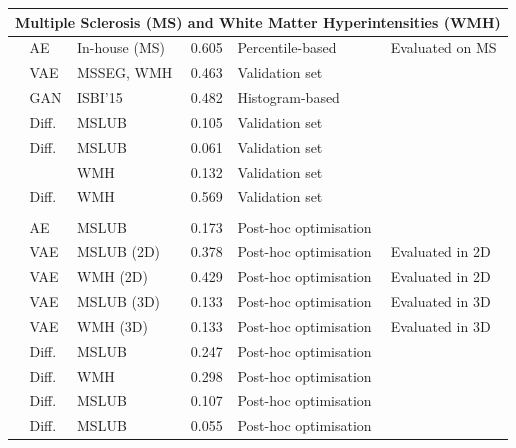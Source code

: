 \begin{longtable}{lp{1.2cm}lclp{5.5cm}}
\multicolumn{6}{l}{\textbf{Multiple Sclerosis (MS) and White Matter Hyperintensities (WMH)}} \\
\midrule
\citet{Baur2018} & AE & In-house (MS) & 0.605 & Percentile-based & Evaluated on MS\\
\citet{Lambert2021} & VAE & MSSEG, WMH & 0.463 & Validation set & \\
\citet{Dey2021} & GAN & ISBI'15 & 0.482 & Histogram-based & \\
\citet{Behrendt2023} & Diff. & MSLUB & 0.105 & Validation set & \\
\citet{Behrendt2024} & Diff. & MSLUB & 0.061 & Validation set & \\
 & & WMH & 0.132 & Validation set & \\
\citet{Fontanella2024} & Diff. & WMH & 0.569 & Validation set & \\
\addlinespace
\multicolumn{6}{l}{\textit{\small --- Studies using Retrospectively Optimized (Oracle) Thresholds ---}} \\
\addlinespace
\citet{Ghorbel2023} & AE & MSLUB & 0.173 & Post-hoc optimisation & \\
\citet{Pinaya2022-2} & VAE & MSLUB (2D)& 0.378 & Post-hoc optimisation & {Evaluated in 2D}\\
\citet{Pinaya2022-2} & VAE & WMH (2D)& 0.429 & Post-hoc optimisation & {Evaluated in 2D}\\
\citet{Pinaya2022-2} & VAE & MSLUB (3D) & 0.133 & Post-hoc optimisation & {Evaluated in 3D}\\
\citet{Pinaya2022-2} & VAE & WMH (3D) & 0.133 & Post-hoc optimisation & {Evaluated in 3D}\\
\citet{Pinaya2022-1} & Diff. & MSLUB & 0.247 & Post-hoc optimisation & \\
\citet{Pinaya2022-1} & Diff. & WMH & 0.298 & Post-hoc optimisation & \\
\citet{Iqbal2023} & Diff. & MSLUB & 0.107 & Post-hoc optimisation & \\
\citet{Kumar2024} & Diff. & MSLUB & 0.055 & Post-hoc optimisation & \\
\end{longtable}